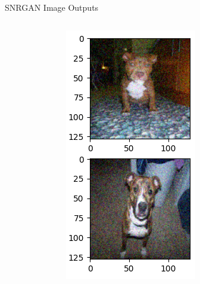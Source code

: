 \begin{frame}{SNRGAN Image Outputs}
\begin{columns}
\begin{column}{0.33\textwidth}
        \end{column}
        \begin{column}{0.33\textwidth}
            \includegraphics[width=\linewidth,height=0.6\textheight,keepaspectratio]{images/img2.png}
        \end{column}
        \begin{column}{0.33\textwidth}

\end{column}
\end{columns}
\end{frame}
